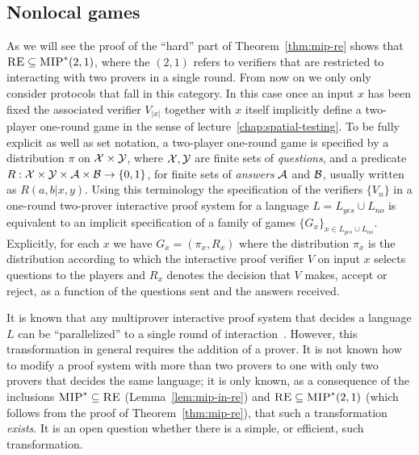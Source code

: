 \subsection{Nonlocal games}
\label{sec:nlgames}

As we will see the proof of the ``hard'' part of Theorem~\ref{thm:mip-re} shows that $\textsc{RE} \subseteq \textsc{MIP}^*(2,1)$, where the $(2,1)$ refers to verifiers that are restricted to interacting with two provers in a single round. From now on we only only consider protocols that fall in this category. In this case once an input $x$ has been fixed the associated verifier $V_{|x|}$ together with $x$ itself implicitly define a two-player one-round game in the sense of lecture~\ref{chap:spatial-testing}. To be fully explicit as well as set notation, a two-player one-round game is specified by a distribution $\pi$ on $\mathcal{X} \times \mathcal{Y}$, where $\mathcal{X}, \mathcal{Y}$ are finite sets of \emph{questions}, and a predicate $R:\mathcal{X}\times \mathcal{Y} \times \mathcal{A} \times \mathcal{B} \to \{0,1\}$, for finite sets of \emph{answers} $\mathcal{A}$ and $\mathcal{B}$, usually written as $R(a,b|x,y)$. Using this terminology the specification of the verifiers $\{V_n\}$ in a one-round two-prover interactive proof system for a language $L=L_{yes}\cup L_{no}$ is equivalent to an implicit specification of a family of games $\{G_x\}_{x\in L_{yes} \cup L_{no}}$. Explicitly, for each $x$ we have $G_x = (\pi_x,R_x)$ where the distribution $\pi_x$ is the distribution according to which the interactive proof verifier $V$ on input $x$ selects questions to the players and $R_x$ denotes the decision that $V$ makes, accept or reject, as a function of the questions sent and the answers received.

\begin{remark}
It is known that any multiprover interactive proof system that decides a language $L$ can be ``parallelized'' to a single round of interaction~\cite{kempe2009using}. However, this transformation in general requires the addition of a prover. It is not known how to modify a proof system with more than two provers to one with only two provers that decides the same language; it is only known, as a consequence of the inclusions $\textsc{MIP}^* \subseteq \textsc{RE}$ (Lemma~\ref{lem:mip-in-re}) and $\textsc{RE}\subseteq \textsc{MIP}^*(2,1)$ (which follows from the proof of Theorem~\ref{thm:mip-re}), that such a transformation \emph{exists}. It is an open question whether there is a simple, or efficient, such transformation. 
\end{remark}

